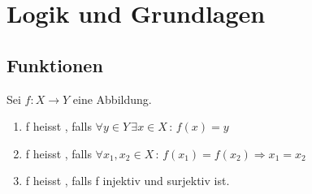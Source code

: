 \section{Logik und Grundlagen}
	\subsection{Funktionen}
		\begin{definition}
			Sei $f: X \to Y$ eine Abbildung.
			\begin{enumerate}
				\item f heisst , falls $\forall y \in Y \, \exists x \in X \, : \, f(x) = y$
				\item f heisst , falls $\forall x_1, x_2 \in X \, : \, f(x_1) = f(x_2) \Rightarrow x_1 = x_2$
				\item f heisst , falls f injektiv und surjektiv ist.
			\end{enumerate}
		\end{definition}